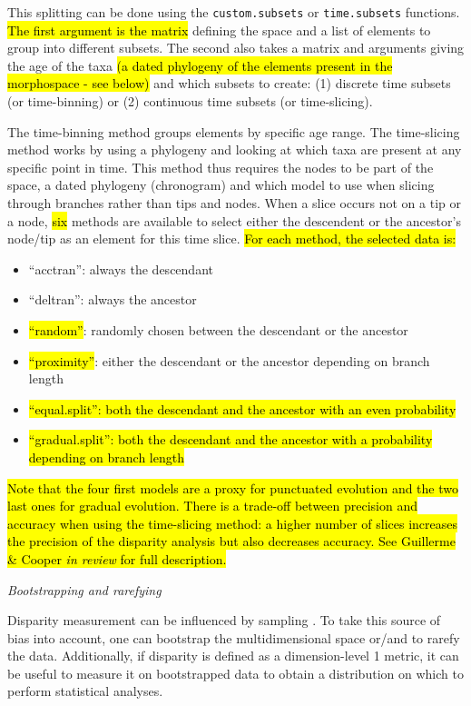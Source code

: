 \documentclass[12pt,letterpaper]{article}
\renewcommand{\subsection}[1]{%
\bigskip
\begin{center}
\begin{large}
\normalfont\itshape #1
\end{large}
\end{center}}
\begin{document}
This splitting can be done using the \texttt{custom.subsets} or \texttt{time.subsets} functions.
\hl{The first argument is the matrix}
defining the space and a list of elements to group into different subsets.
The second also takes a matrix and arguments giving the age of the taxa 
\hl{(a dated phylogeny of the elements present in the morphospace - see below)}
and which subsets to create: (1) discrete time subsets (or time-binning) or (2) continuous time subsets (or time-slicing).

The time-binning method groups elements by specific age range.
The time-slicing method works by using a phylogeny and looking at which taxa are present at any specific point in time.
This method thus requires the nodes to be part of the space, a dated phylogeny (chronogram) and which model to use when slicing through branches rather than tips and nodes.
When a slice occurs not on a tip or a node, \hl{six} methods are available to select either the descendent or the ancestor's node/tip as an element for this time slice.
\hl{For each method, the selected data is:}
\begin{itemize}
    \item ``acctran'': always the descendant
    \item ``deltran'': always the ancestor
    \item \hl{``random''}: randomly chosen between the descendant or the ancestor
    \item \hl{``proximity''}: either the descendant or the ancestor depending on branch length
    \item \hl{``equal.split'': both the descendant and the ancestor with an even probability}
    \item \hl{``gradual.split'': both the descendant and the ancestor with a probability depending on branch length}
\end{itemize}

\hl{Note that the four first models are a proxy for punctuated evolution and the two last ones for gradual evolution.
There is a trade-off between precision and accuracy when using the time-slicing method: a higher number of slices increases the precision of the disparity analysis but also decreases accuracy.
See Guillerme \& Cooper \textit{in review} for full description.}

\subsection{Bootstrapping and rarefying}
Disparity measurement can be influenced by sampling \citep{Butler2012}.
To take this source of bias into account, one can bootstrap the multidimensional space or/and to rarefy the data.
Additionally, if disparity is defined as a dimension-level 1 metric, it can be useful to measure it on bootstrapped data to obtain a distribution on which to perform statistical analyses.
\end{document}
